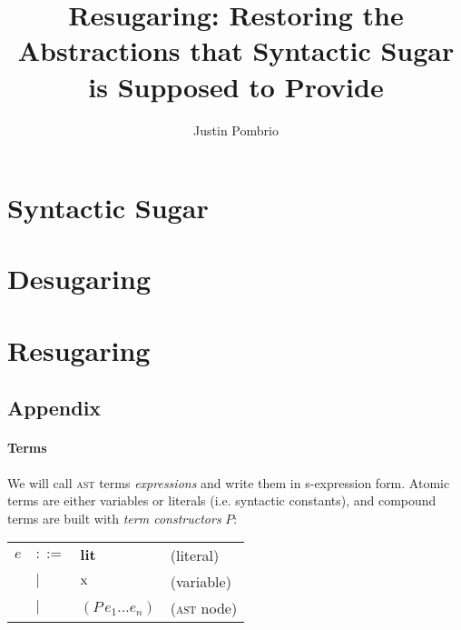 \documentclass[
  11pt,
  paper=letter,
  footinclude=true,
  headinclude=true,
  american
]{scrbook}
\makeatletter
\newenvironment{Table}
  {\begin{center}\begin{tabular}{l l l @{\quad}l}}
  {\end{tabular}\end{center}}
\makeatother
\begin{document}
\author{Justin Pombrio}
\title{Resugaring: Restoring the Abstractions that Syntactic Sugar is Supposed to Provide}
\maketitle


\part{Syntactic Sugar}


\part{Desugaring}


\part{Resugaring}







\chapter{Appendix}


\newcommand{\lit}[1]{\textbf{#1}}
\newcommand{\expr}[2]{(#1\,#2)}
\newcommand{\var}[1]{\textrm{\textsc{#1}}}

\newcommand{\exprs}[3]{(#1\,#2\,#3^{*})}
\newcommand{\production}[2]{#1 \leftarrow #2}
\newcommand{\saysG}[3]{#1 \vdash #2\,:\,#3}


\subsection{Terms}

We will call \textsc{ast} terms \emph{expressions} and write them in
s-expression form. Atomic terms are either variables or literals
(i.e. syntactic constants), and compound terms are built with
\emph{term constructors} $P$:

\begin{Table}
  $e$
  &$::=$& $\lit{lit}$ &(literal) \\
  &$|$&   $\var{x}$ &(variable) \\
  &$|$&   $\expr{P}{e_1 ... e_n}$ &(\textsc{ast} node)
\end{Table}
\end{document}
